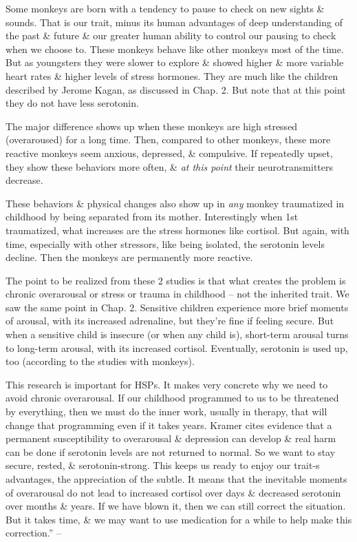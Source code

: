 \documentclass{article}
\numberwithin{equation}{section}
\begin{document}
Some monkeys are born with a tendency to pause to check on new sights \& sounds. That is our trait, minus its human advantages of deep understanding of the past \& future \& our greater human ability to control our pausing to check when we choose to. These monkeys behave like other monkeys most of the time. But as youngsters they were slower to explore \& showed higher \& more variable heart rates \& higher levels of stress hormones. They are much like the children described by Jerome Kagan, as discussed in Chap. 2. But note that at this point they do not have less serotonin.

The major difference shows up when these monkeys are high stressed (overaroused) for a long time. Then, compared to other monkeys, these more reactive monkeys seem anxious, depressed, \& compulsive. If repeatedly upset, they show these behaviors more often, \& \textit{at this point} their neurotransmitters decrease.

These behaviors \& physical changes also show up in \textit{any} monkey traumatized in childhood by being separated from its mother. Interestingly when 1st traumatized, what increases are the stress hormones like cortisol. But again, with time, especially with other stressors, like being isolated, the serotonin levels decline. Then the monkeys are permanently more reactive.

The point to be realized from these 2 studies is that what creates the problem is chronic overarousal or stress or trauma in childhood -- not the inherited trait. We saw the same point in Chap. 2. Sensitive children experience more brief moments of arousal, with its increased adrenaline, but they're fine if feeling secure. But when a sensitive child is insecure (or when any child is), short-term arousal turns to long-term arousal, with its increased cortisol. Eventually, serotonin is used up, too (according to the studies with monkeys).

This research is important for HSPs. It makes very concrete why we need to avoid chronic overarousal. If our childhood programmed to us to be threatened by everything, then we must do the inner work, usually in therapy, that will change that programming even if it takes years. Kramer cites evidence that a permanent susceptibility to overarousal \& depression can develop \& real harm can be done if serotonin levels are not returned to normal. So we want to stay secure, rested, \& serotonin-strong. This keeps us ready to enjoy our trait-s advantages, the appreciation of the subtle. It means that the inevitable moments of overarousal do not lead to increased cortisol over days \& decreased serotonin over months \& years. If we have blown it, then we can still correct the situation. But it takes time, \& we may want to use medication for a while to help make this correction.'' -- \cite[p. 232--234]{Aron2013}
\end{document}
